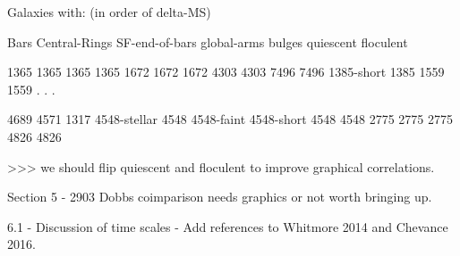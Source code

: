 Galaxies with: (in order of delta-MS)
 
Bars                       Central-Rings      SF-end-of-bars   global-arms         bulges   quiescent             floculent                             
 
1365                      1365                      1365                      1365                                                                     
1672                      1672                      1672                                                                                                     
4303                                                      4303                                                                                                     
7496                                                      7496                                                                                                     
1385-short                                                                                                                                                          1385                     
1559                                                                                      1559
.
.
.
 
                                                                                                                                                4689
                                                                                                                                                4571
                                                                                                                                                1317
4548-stellar        4548                      4548-faint            4548-short                          4548                      4548     
                                                                                                                                2775      2775                      2775
                                                                                                                                4826      4826     
 
 
>>> we should flip quiescent and floculent to improve graphical correlations.
               
 
 
Section 5 - 2903 Dobbs coimparison needs graphics or not worth bringing up. 
 
 
 
6.1 - Discussion of time scales - Add references to Whitmore 2014 and Chevance 2016.
 
